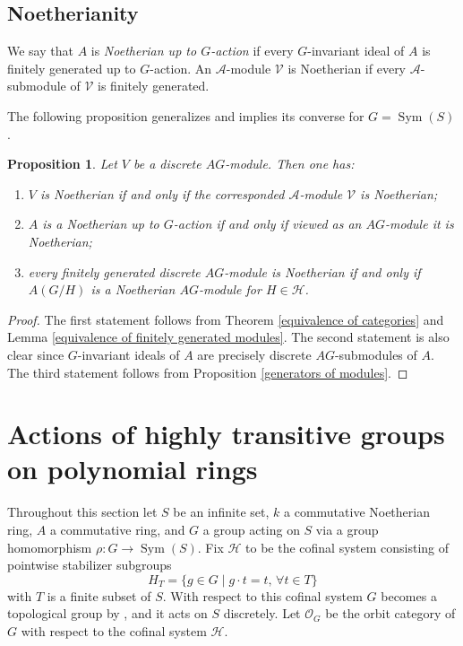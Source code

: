 \documentclass[11pt, reqno]{amsart}
\theoremstyle{plain}
\newtheorem{proposition}[theorem]{Proposition}
\numberwithin{equation}{section}
\theoremstyle{definition}
\DeclareMathOperator{\Sym}{Sym}
\begin{document}
\subsection{Noetherianity}

We say that $A$ is \textit{Noetherian up to $G$-action} if every $G$-invariant ideal of $A$ is finitely generated up to $G$-action. An $\mathcal{A}$-module $\mathcal{V}$ is Noetherian if every $\mathcal{A}$-submodule of $\mathcal{V}$ is finitely generated.

The following proposition generalizes \cite[Theorem 4.6]{NR1} and implies its converse for $G = \Sym(S)$.

\begin{proposition} \label{equivalence of Noetherianity}
Let $V$ be a discrete $AG$-module. Then one has:
\begin{enumerate}
\item $V$ is Noetherian if and only if the corresponded $\mathcal{A}$-module $\mathcal{V}$ is Noetherian;

\item $A$ is a Noetherian up to $G$-action if and only if viewed as an $AG$-module it is Noetherian;

\item every finitely generated discrete $AG$-module is Noetherian if and only if $A(G/H)$ is a Noetherian $AG$-module for $H \in \mathcal{H}$.
\end{enumerate}
\end{proposition}

\begin{proof}
The first statement follows from Theorem \ref{equivalence of categories} and Lemma \ref{equivalence of finitely generated modules}. The second statement is also clear since $G$-invariant ideals of $A$ are precisely discrete $AG$-submodules of $A$. The third statement follows from Proposition \ref{generators of modules}.
\end{proof}


\section{Actions of highly transitive groups on polynomial rings}

Throughout this section let $S$ be an infinite set, $k$ a commutative Noetherian ring, $A$ a commutative ring, and $G$ a group acting on $S$ via a group homomorphism $\rho: G \to \Sym(S)$. Fix $\mathcal{H}$ to be the cofinal system consisting of pointwise stabilizer subgroups
\[
H_T = \{ g \in G \mid g \cdot t = t, \, \forall t \in T \}
\]
with $T$ is a finite subset of $S$. With respect to this cofinal system $G$ becomes a topological group by \cite[III.20, Theorem 3]{Hu}, and it acts on $S$ discretely. Let $\mathcal{O}_G$ be the orbit category of $G$ with respect to the cofinal system $\mathcal{H}$.
\end{document}
